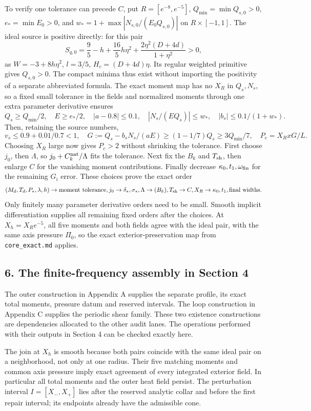 \documentclass[10pt,a4paper]{article}
\begin{document}
To verify one tolerance can precede \(C\), put \(R=[e^{-8},e^{-5}]\), \(Q_{\min}=\min Q_{s,0}>0\), \(e_* =\min E_0>0\), and \(w_*=1+\max|N_{s,0}/(E_0Q_{s,0})|\) on \(R\times[-1,1]\). The ideal source is positive directly: for this pair
\[
S_{q,0}=\frac95-h+\frac{16}{5}h\eta^2
+\frac{2\eta^2(D+4d)}{1+\eta^2}>0,
\]
as \(W=-3+8h\eta^2\), \(l=3/5\), \(H_c=(D+4d)\eta\). Its regular weighted primitive gives \(Q_{s,0}>0\). The compact minima thus exist without importing the positivity of a separate abbreviated formula. The exact moment map has no \(X_R\) in \(Q_s,N_s\), so a fixed small tolerance in the fields and normalized moments through one extra parameter derivative ensures
\[
Q_s\ge Q_{\min}/2,\quad E\ge e_*/2,\quad |a-0.8|\le0.1,
\quad|N_s/(EQ_s)|\le w_*,\quad |b_s|\le0.1/(1+w_*).
\]
Then, retaining the source numbers,
\[
v_s\le0.9+0.01/0.7<1,
\quad G:=Q_s-b_sN_s/(aE)\ge(1-1/7)Q_s\ge3Q_{\min}/7,
\quad P_c=X_RxG/L.
\]
Choosing \(X_R\) large now gives \(P_c>2\) without shrinking the tolerance. First choose \(j_0\), then \(\Lambda\), so \(j_0+C_k^{\rm nat}/\Lambda\) fits the tolerance. Next fix the \(B_k\) and \(T_{\rm sh}\), then enlarge \(C\) for the vanishing moment contributions. Finally decrease \(\kappa_0,t_1,\omega_{\rm fin}\) for the remaining \(G_i\) error. These choices prove the exact order
\[
(M_d,T_d,P_*,\lambda,h)\to\text{moment tolerance},j_0
\to\delta_*,\sigma_*,\Lambda\to(B_k),T_{\rm sh}
\to C,X_R\to\kappa_0,t_1,\text{final widths}.
\]
Only finitely many parameter derivative orders need to be small. Smooth implicit differentiation supplies all remaining fixed orders after the choices. At \(X_h=X_Re^{-5}\), all five moments and both fields agree with the ideal pair, with the same axis pressure \(\Pi_0\), so the exact exterior-preservation map from \texttt{core\_exact.md} applies.

\subsection{6. The finite-frequency assembly in Section 4}

The outer construction in Appendix A supplies the separate profile, its exact total moments, pressure datum and reserved intervals. The loop construction in Appendix C supplies the periodic shear family. These two existence constructions are dependencies allocated to the other audit lanes. The operations performed with their outputs in Section 4 can be checked exactly here.

The join at \(X_h\) is smooth because both pairs coincide with the same ideal pair on a neighborhood, not only at one radius. Their five matching moments and common axis pressure imply exact agreement of every integrated exterior field. In particular all total moments and the outer heat field persist. The perturbation interval \(I=[X_-,X_+]\) lies after the reserved analytic collar and before the first repair interval; its endpoints already have the admissible cone.
\end{document}
